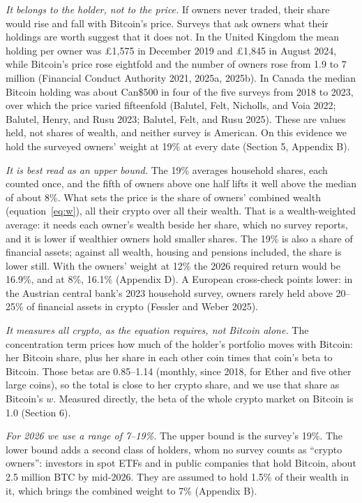 \documentclass[11pt]{article}
\begin{document}
\emph{It belongs to the holder, not to the price.} If owners never traded, their share would rise and fall with Bitcoin's price. Surveys that ask owners what their holdings are worth suggest that it does not. In the United Kingdom the mean holding per owner was \pounds 1,575 in December 2019 and \pounds 1,845 in August 2024, while Bitcoin's price rose eightfold and the number of owners rose from 1.9 to 7 million (Financial Conduct Authority 2021, 2025a, 2025b). In Canada the median Bitcoin holding was about Can\$500 in four of the five surveys from 2018 to 2023, over which the price varied fifteenfold (Balutel, Felt, Nicholls, and Voia 2022; Balutel, Henry, and Rusu 2023; Balutel, Felt, and Rusu 2025). These are values held, not shares of wealth, and neither survey is American. On this evidence we hold the surveyed owners' weight at 19\% at every date (Section 5, Appendix B).

\emph{It is best read as an upper bound.} The 19\% averages household shares, each counted once, and the fifth of owners above one half lifts it well above the median of about 8\%. What sets the price is the share of owners' combined wealth (equation~\ref{eq:w}), all their crypto over all their wealth. That is a wealth-weighted average: it needs each owner's wealth beside her share, which no survey reports, and it is lower if wealthier owners hold smaller shares. The 19\% is also a share of financial assets; against all wealth, housing and pensions included, the share is lower still. With the owners' weight at 12\% the 2026 required return would be 16.9\%, and at 8\%, 16.1\% (Appendix D). A European cross-check points lower: in the Austrian central bank's 2023 household survey, owners rarely held above 20--25\% of financial assets in crypto (Fessler and Weber 2025).

\emph{It measures all crypto, as the equation requires, not Bitcoin alone.} The concentration term prices how much of the holder's portfolio moves with Bitcoin: her Bitcoin share, plus her share in each other coin times that coin's beta to Bitcoin. Those betas are 0.85--1.14 (monthly, since 2018, for Ether and five other large coins), so the total is close to her crypto share, and we use that share as Bitcoin's $w$. Measured directly, the beta of the whole crypto market on Bitcoin is 1.0 (Section 6).

\emph{For 2026 we use a range of 7--19\%.} The upper bound is the survey's 19\%. The lower bound adds a second class of holders, whom no survey counts as ``crypto owners'': investors in spot ETFs and in public companies that hold Bitcoin, about 2.5 million BTC by mid-2026. They are assumed to hold 1.5\% of their wealth in it, which brings the combined weight to 7\% (Appendix B).
\end{document}
